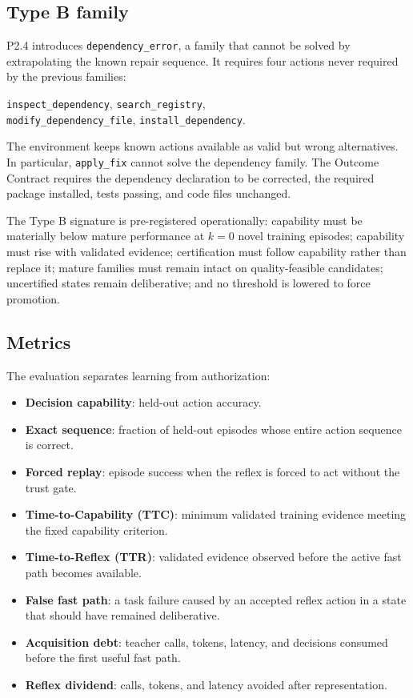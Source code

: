 \documentclass[10pt]{article}
\begin{document}
\subsection{Type B family}

P2.4 introduces \texttt{dependency\_error}, a family that cannot be solved by extrapolating the known repair sequence. It requires four actions never required by the previous families:
\begin{center}
\texttt{inspect\_dependency}, \texttt{search\_registry},\\
\texttt{modify\_dependency\_file}, \texttt{install\_dependency}.
\end{center}
The environment keeps known actions available as valid but wrong alternatives. In particular, \texttt{apply\_fix} cannot solve the dependency family. The Outcome Contract requires the dependency declaration to be corrected, the required package installed, tests passing, and code files unchanged.

The Type B signature is pre-registered operationally: capability must be materially below mature performance at $k=0$ novel training episodes; capability must rise with validated evidence; certification must follow capability rather than replace it; mature families must remain intact on quality-feasible candidates; uncertified states remain deliberative; and no threshold is lowered to force promotion.

\subsection{Metrics}

The evaluation separates learning from authorization:
\begin{itemize}
  \item \textbf{Decision capability}: held-out action accuracy.
  \item \textbf{Exact sequence}: fraction of held-out episodes whose entire action sequence is correct.
  \item \textbf{Forced replay}: episode success when the reflex is forced to act without the trust gate.
  \item \textbf{Time-to-Capability (TTC)}: minimum validated training evidence meeting the fixed capability criterion.
  \item \textbf{Time-to-Reflex (TTR)}: validated evidence observed before the active fast path becomes available.
  \item \textbf{False fast path}: a task failure caused by an accepted reflex action in a state that should have remained deliberative.
  \item \textbf{Acquisition debt}: teacher calls, tokens, latency, and decisions consumed before the first useful fast path.
  \item \textbf{Reflex dividend}: calls, tokens, and latency avoided after representation.
\end{itemize}
\end{document}
